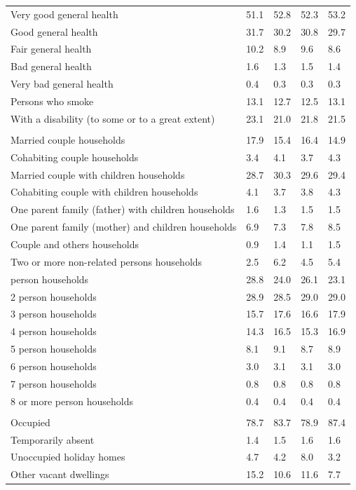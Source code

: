 \documentclass{article}
\begin{document}
\begin{table}[h]
\begin{tabular}{KTTTT}
    \hline
Very good general health & 51.1& 52.8&52.3& 53.2\\
Good general health & 31.7& 30.2& 30.8& 29.7\\
Fair general health & 10.2&  8.9& 9.6&  8.6\\
Bad general health & 1.6& 1.3&1.5& 1.4\\
Very bad general health & 0.4& 0.3&0.3& 0.3\\
    \hline
Persons who smoke & 13.1& 12.7&12.5& 13.1\\
    \hline
With a disability (to some or to a great extent) & 23.1& 21.0&21.8& 21.5\\
\hline
    \\ 
    \hline
Married couple households & 17.9& 15.4& 16.4& 14.9\\
Cohabiting couple households & 3.4& 4.1& 3.7& 4.3\\
Married couple with children households & 28.7& 30.3& 29.6& 29.4\\
Cohabiting couple with children households & 4.1& 3.7& 3.8& 4.3\\
One parent family (father) with  children households & 1.6& 1.3& 1.5& 1.5\\
One parent family (mother) and children households & 6.9& 7.3& 7.8& 8.5\\
Couple and others households  & 0.9& 1.4& 1.1& 1.5\\
Two or more non-related persons households & 2.5& 6.2& 4.5& 5.4\\
     person households & 28.8& 24.0& 26.1& 23.1\\
2 person households & 28.9& 28.5& 29.0& 29.0\\
3 person households & 15.7& 17.6& 16.6& 17.9\\
4 person households & 14.3& 16.5& 15.3& 16.9\\
5 person households & 8.1& 9.1& 8.7& 8.9\\
6 person households & 3.0& 3.1& 3.1& 3.0\\
7 person households & 0.8& 0.8& 0.8& 0.8\\
8 or more person households & 0.4& 0.4& 0.4& 0.4\\
\hline
    \\ 
    \hline
Occupied & 78.7& 83.7& 78.9& 87.4\\
Temporarily absent & 1.4& 1.5& 1.6& 1.6\\
Unoccupied holiday homes & 4.7& 4.2& 8.0& 3.2\\
Other vacant dwellings & 15.2& 10.6& 11.6&  7.7\\
\hline
\end{tabular}
\end{table}
\end{document}
